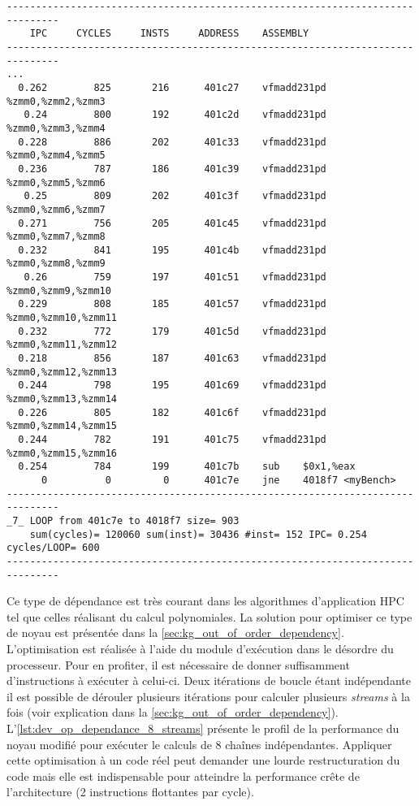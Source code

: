         
 \begin{lstlisting}[label=lst:dev_op_dependance, caption=Noyau de calcul présentant une dépendance entre chaque instruction.]
-------------------------------------------------------------------------------
    IPC     CYCLES     INSTS     ADDRESS    ASSEMBLY                         
-------------------------------------------------------------------------------
...
  0.262        825       216      401c27    vfmadd231pd %zmm0,%zmm2,%zmm3
   0.24        800       192      401c2d    vfmadd231pd %zmm0,%zmm3,%zmm4
  0.228        886       202      401c33    vfmadd231pd %zmm0,%zmm4,%zmm5
  0.236        787       186      401c39    vfmadd231pd %zmm0,%zmm5,%zmm6
   0.25        809       202      401c3f    vfmadd231pd %zmm0,%zmm6,%zmm7
  0.271        756       205      401c45    vfmadd231pd %zmm0,%zmm7,%zmm8
  0.232        841       195      401c4b    vfmadd231pd %zmm0,%zmm8,%zmm9
   0.26        759       197      401c51    vfmadd231pd %zmm0,%zmm9,%zmm10
  0.229        808       185      401c57    vfmadd231pd %zmm0,%zmm10,%zmm11
  0.232        772       179      401c5d    vfmadd231pd %zmm0,%zmm11,%zmm12
  0.218        856       187      401c63    vfmadd231pd %zmm0,%zmm12,%zmm13
  0.244        798       195      401c69    vfmadd231pd %zmm0,%zmm13,%zmm14
  0.226        805       182      401c6f    vfmadd231pd %zmm0,%zmm14,%zmm15
  0.244        782       191      401c75    vfmadd231pd %zmm0,%zmm15,%zmm16
  0.254        784       199      401c7b    sub    $0x1,%eax
      0          0         0      401c7e    jne    4018f7 <myBench>
-------------------------------------------------------------------------------
_7_ LOOP from 401c7e to 4018f7 size= 903 
    sum(cycles)= 120060 sum(inst)= 30436 #inst= 152 IPC= 0.254 cycles/LOOP= 600
-------------------------------------------------------------------------------
\end{lstlisting}

        Ce type de dépendance est très courant dans les algorithmes d'application HPC tel que celles réalisant du calcul polynomiales. La solution pour optimiser ce type de noyau est présentée dans la \autoref{sec:kg_out_of_order_dependency}. L'optimisation est réalisée à l'aide du module d'exécution dans le désordre du processeur. Pour en profiter, il est nécessaire de donner suffisamment d'instructions à exécuter à celui-ci. Deux itérations de boucle étant indépendante il est possible de dérouler plusieurs itérations pour calculer plusieurs \textit{streams} à la fois (voir explication dans la \autoref{sec:kg_out_of_order_dependency}). L'\autoref{lst:dev_op_dependance_8_streams} présente le profil de la performance du noyau modifié pour exécuter le calculs de 8 chaînes indépendantes. Appliquer cette optimisation à un code réel peut demander une lourde restructuration du code mais elle est indispensable pour atteindre la performance crête de l'architecture (2 instructions flottantes par cycle).
        

